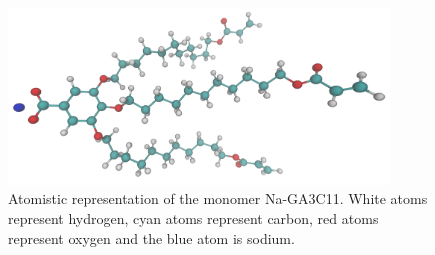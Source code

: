 \documentclass{article}
\begin{document}
  \begin{figure}[!htb]
	\centering
        \includegraphics[width=0.9\textwidth]{monomer.png}
	\caption{Atomistic representation of the monomer Na-GA3C11. White atoms
		represent hydrogen, cyan atoms represent carbon, red atoms represent oxygen and
		the blue atom is sodium.}\label{fig:monomer}
  \end{figure}
  
  \clearpage
\end{document}
